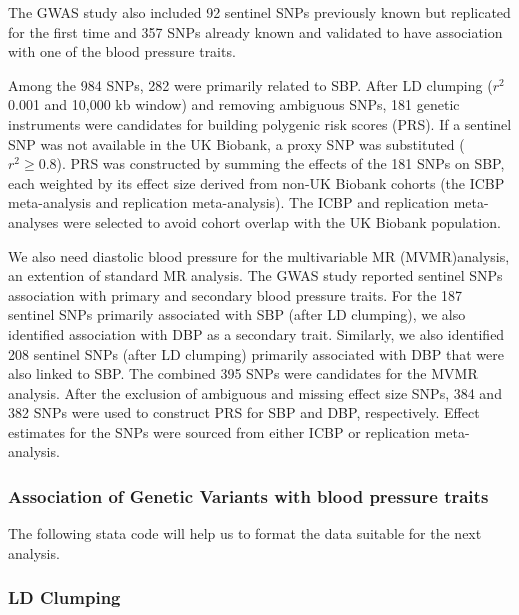 \documentclass[11pt]{article}
\begin{document}
The GWAS study also included 92 sentinel SNPs previously known but replicated for the first time and 357 SNPs already known and validated to have association with one of the blood pressure traits.  

Among the 984 SNPs, 282 were primarily related to SBP\cite{evangelou2018genetic}. After LD clumping (\( r^{2} \)  0.001 and 10,000 kb window) and removing ambiguous SNPs, 181 genetic instruments were candidates for building polygenic risk scores (PRS).  If a sentinel SNP was not available in the UK Biobank, a proxy SNP was substituted  (\( r^2 \geq 0.8 \))\cite{evangelou2018genetic}.  PRS was constructed by summing the effects of the 181 SNPs on SBP, each weighted by its effect size derived from non-UK Biobank cohorts (the ICBP meta-analysis and replication meta-analysis). The ICBP and replication meta-analyses were selected to avoid cohort overlap with the UK Biobank population.

We also need diastolic blood pressure for the multivariable MR (MVMR)analysis, an extention of standard MR analysis. The GWAS study reported sentinel SNPs association with primary and secondary blood pressure traits\cite{evangelou2018genetic}. For the 187 sentinel SNPs primarily associated with SBP (after LD clumping), we also identified association with DBP as a secondary trait. Similarly, we also identified 208 sentinel SNPs (after LD clumping) primarily associated with DBP that were also linked to SBP. The combined 395 SNPs were candidates for the MVMR analysis. After the exclusion of ambiguous and missing effect size SNPs, 384 and 382 SNPs were used to construct PRS for SBP and DBP, respectively. Effect estimates for the SNPs were sourced from either ICBP or replication meta-analysis.

\subsubsection{Association of Genetic Variants with blood pressure traits}

The following stata code will help us to format the data suitable for the next analysis. 
\color{violet}
\begin{stlog}\end{stlog}
\color{black}
\subsubsection{LD Clumping}
\end{document}
